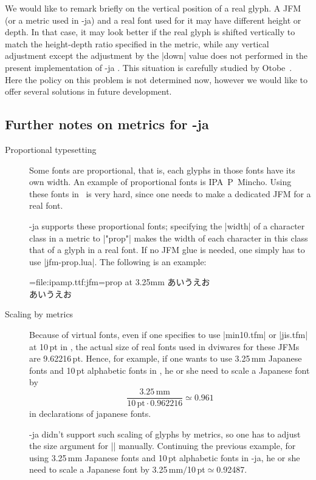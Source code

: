 \documentclass{ajt}
\begin{document}
We would like to remark briefly on the vertical position of a real
glyph.  A JFM (or a metric used in \LuaTeX-ja) and a real font used for
it may have different height or depth.  In that case, it may look better
if the real glyph is shifted vertically to match the height-depth ratio
specified in the metric, while any vertical adjustment except the
adjustment by the |down| value does not performed in the present
implementation of \LuaTeX-ja . This situation is carefully studied by
Otobe~\cite{min10}. Here the policy on this problem is not determined
now, however we would like to offer several solutions in future
development.


\subsection{Further notes on metrics for \LuaTeX-ja}
\label{ssec-jfmnote}
\begin{description}
\item[Proportional typesetting]
Some fonts are proportional, that is, each glyphs in those fonts have
	   its own width. An example of proportional fonts is
	   IPA~P~Mincho. Using these fonts in \pTeX\ is very
	   hard, since one needs to make a dedicated JFM for a real font.

\LuaTeX-ja supports these proportional fonts; specifying the |width| of
	   a character class in a metric to |"prop"| makes the width of
	   each character in this class that of a glyph in a real font.
If no JFM glue is needed, one simply has to use |jfm-prop.lua|. The
	   following is an example:
\begin{LTXexample}
\jfont\pr=file:ipamp.ttf:jfm=prop at 3.25mm 
あいうえお\\\pr{}あいうえお
\end{LTXexample}

\item[Scaling by metrics]
Because of virtual fonts, even if one specifies to use |min10.tfm| or
	   |jis.tfm| at 10\,pt in \pTeX, the actual size of real fonts used in
	   dviwares for these JFMs are 9.62216\,pt. Hence, for
	   example, if one wants to use 3.25\,mm Japanese
	   fonts and 10\,pt alphabetic fonts in \pTeX, 
	   he or she need to scale a Japanese font by
\[
 \frac{3.25\,\mathrm{mm}}{10\,\mathrm{pt}\cdot 0.962216}\simeq 0.961
\]
in declarations of japanese fonts.

\LuaTeX-ja didn't support such scaling of glyphs by metrics, so one has
	   to adjust the size argument for |\jfont| manually. Continuing
	   the previous example, for using 3.25\,mm Japanese
	   fonts and 10\,pt alphabetic fonts in \LuaTeX-ja, 
he or she need to scale a Japanese font by
3.25\,mm${}/{}$10\,pt${}\simeq{}$0.92487.
\end{description}
\end{document}
